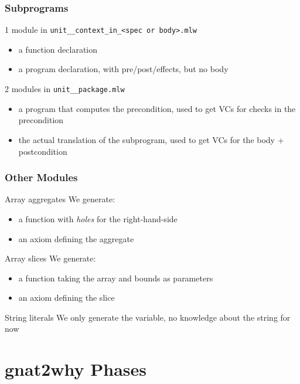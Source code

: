 \documentclass{beamer}
\newcommand{\vs}{\vspace{0.5cm}}
\newenvironment{specialframe}{%
  \begin{frame}[fragile,environment=specialframe]}{\end{frame}}
\begin{document}
\begin{specialframe}\frametitle{Subprograms}

1 module in \verb|unit__context_in_<spec or body>.mlw|
   \begin{itemize}
      \item a function declaration
      \item a program declaration, with pre/post/effects, but no body
      \end{itemize}

\vs

2 modules in \verb|unit__package.mlw|
     \begin{itemize}
      \item a program that computes the precondition, used to get VCs
for checks in the precondition
      \item the actual translation of the subprogram, used to get
VCs for the body + postcondition
   \end{itemize}
\end{specialframe}

\begin{specialframe}\frametitle{Other Modules}

   \begin{block}{Array aggregates}
      We generate:
   \begin{itemize}
      \item a function with \emph{holes} for the right-hand-side
      \item an axiom defining the aggregate
   \end{itemize}
   \end{block}
\vs
   \begin{block}{Array slices}
      We generate:
   \begin{itemize}
      \item a function taking the array and bounds as parameters
      \item an axiom defining the slice
   \end{itemize}
   \end{block}
\vs
   \begin{block}{String literals}
      We only generate the variable, no knowledge about the string for now
   \end{block}
\end{specialframe}


\section{gnat2why Phases}
\end{document}
